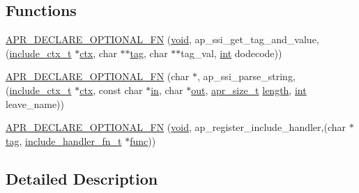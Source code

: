 \subsection*{Functions}
\begin{DoxyCompactItemize}
\item 
\hyperlink{group__MOD__INCLUDE_ga8b0576296b57010db75f1405d2aca4b6}{A\+P\+R\+\_\+\+D\+E\+C\+L\+A\+R\+E\+\_\+\+O\+P\+T\+I\+O\+N\+A\+L\+\_\+\+FN} (\hyperlink{group__MOD__ISAPI_gacd6cdbf73df3d9eed42fa493d9b621a6}{void}, ap\+\_\+ssi\+\_\+get\+\_\+tag\+\_\+and\+\_\+value,(\hyperlink{structinclude__ctx__t}{include\+\_\+ctx\+\_\+t} $\ast$\hyperlink{group__APR__Util__Bucket__Brigades_ga0525238c5b09cb4ac5067ddec654d09c}{ctx}, char $\ast$$\ast$\hyperlink{group__APACHE__CORE__HTTPD_ga7bb5e40c10df6a41df64bda1f4bb3e26}{tag}, char $\ast$$\ast$tag\+\_\+val, \hyperlink{pcre_8txt_a42dfa4ff673c82d8efe7144098fbc198}{int} dodecode))
\item 
\hyperlink{group__MOD__INCLUDE_ga538494b98a5d1f9571050d8117649584}{A\+P\+R\+\_\+\+D\+E\+C\+L\+A\+R\+E\+\_\+\+O\+P\+T\+I\+O\+N\+A\+L\+\_\+\+FN} (char $\ast$, ap\+\_\+ssi\+\_\+parse\+\_\+string,(\hyperlink{structinclude__ctx__t}{include\+\_\+ctx\+\_\+t} $\ast$\hyperlink{group__APR__Util__Bucket__Brigades_ga0525238c5b09cb4ac5067ddec654d09c}{ctx}, const char $\ast$\hyperlink{group__apr__thread__proc_ga2e46fea00cc2238744ebca5061c62bcc}{in}, char $\ast$\hyperlink{apr__sha1_8h_acc4166708bf1c388b137e1861496523e}{out}, \hyperlink{group__apr__platform_gaaa72b2253f6f3032cefea5712a27540e}{apr\+\_\+size\+\_\+t} \hyperlink{pcregrep_8txt_ac76ee5ca1111cbb38887e0d698e8ea08}{length}, \hyperlink{pcre_8txt_a42dfa4ff673c82d8efe7144098fbc198}{int} leave\+\_\+name))
\item 
\hyperlink{group__MOD__INCLUDE_gaccab2b32773c9e30c4f4a53a75a3bffd}{A\+P\+R\+\_\+\+D\+E\+C\+L\+A\+R\+E\+\_\+\+O\+P\+T\+I\+O\+N\+A\+L\+\_\+\+FN} (\hyperlink{group__MOD__ISAPI_gacd6cdbf73df3d9eed42fa493d9b621a6}{void}, ap\+\_\+register\+\_\+include\+\_\+handler,(char $\ast$\hyperlink{group__APACHE__CORE__HTTPD_ga7bb5e40c10df6a41df64bda1f4bb3e26}{tag}, \hyperlink{group__MOD__INCLUDE_ga9f4b1b811067b96814b28e9e800d55dc}{include\+\_\+handler\+\_\+fn\+\_\+t} $\ast$\hyperlink{group__apr__thread__proc_ga40bf04c29bfb67c93dc7dc5075531285}{func}))
\end{DoxyCompactItemize}


\subsection{Detailed Description}


